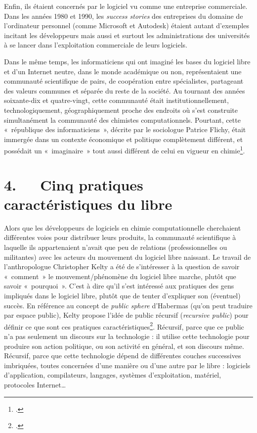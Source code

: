 \documentclass{FramateX}
\begin{document}
\begin{refsection}
Enfin, ils étaient concernés par le logiciel vu comme une entreprise
commerciale. Dans les années 1980 et 1990, les
\textit{success stories} des entreprises du domaine de
l'ordinateur personnel (comme Microsoft et Autodesk)
étaient autant d'exemples incitant les développeurs
mais aussi et surtout les administrations des universités à se lancer
dans l'exploitation commerciale de leurs logiciels.

Dans le même temps, les informaticiens qui ont imaginé les bases du
logiciel libre et d'un Internet neutre, dans le monde
académique ou non, représentaient une communauté scientifique de pairs,
de coopération entre spécialistes, partageant des valeurs communes et
séparée du reste de la société. Au tournant des années soixante-dix et
quatre-vingt, cette communauté était institutionnellement,
technologiquement, géographiquement proche des endroits où
s'est construite simultanément la communauté des
chimistes computationnels. Pourtant, cette «~république des
informaticiens~», décrite par le sociologue Patrice Flichy, était
immergée dans un contexte économique et politique complètement
différent, et possédait un «~imaginaire~» tout aussi différent de celui
en vigueur en chimie\footnote{\cite{flichyinternet1999}.}.

\section*{4.~~~Cinq pratiques caractéristiques du libre}
{}


Alors que les développeurs de logiciels en chimie computationnelle
cherchaient différentes voies pour distribuer leurs produits, la
communauté scientifique à laquelle ils appartenaient
n'avait que peu de relations (professionnelles ou
militantes) avec les acteurs du mouvement du logiciel libre naissant.
Le travail de l'anthropologue Christopher Kelty a été de
s'intéresser à la question de savoir «~comment~» le
mouvement/phénomène du logiciel libre marche, plutôt que savoir
«~pourquoi~». C'est à dire qu'il
s'est intéressé aux pratiques des gens impliqués dans
le logiciel libre, plutôt que de tenter d'expliquer
son (éventuel) succès. En référence au concept de \textit{public
sphere} d'Habermas (qu'on peut
traduire par espace public), Kelty propose l'idée de
public récursif (\textit{recursive public}) pour définir ce que
sont ces pratiques caractéristiques\footnote{\cite{Kelty2004}.}. Récursif, parce que ce public n'a pas seulement un discours sur la
technologie : il utilise cette technologie pour produire son action
politique, ou son activité en général, et son discours même. Récursif,
parce que cette technologie dépend de différentes couches successives
imbriquées, toutes concernées d'une manière ou
d'une autre par le libre : logiciels
d'application, compilateurs, langages, systèmes
d'exploitation, matériel, protocoles Internet\ldots


\end{refsection}
\end{document}
